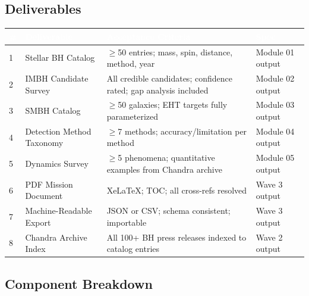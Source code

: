 \documentclass[11pt,letterpaper]{article}
\newcommand{\tableheader}[1]{\textbf{\sffamily\textcolor{white}{#1}}}
\begin{document}
\subsection{Deliverables}

\begin{center}
\begin{tabularx}{\textwidth}{C{0.5cm}L{3.5cm}L{4cm}X}
\toprule
{}
\tableheader{\#} & \tableheader{Deliverable} & \tableheader{Acceptance Criteria} & \tableheader{Spec} \\
 & Stellar BH Catalog & $\geq$50 entries; mass, spin, distance, method, year & Module 01 output \\
2 & IMBH Candidate Survey & All credible candidates; confidence rated; gap analysis included & Module 02 output \\
3 & SMBH Catalog & $\geq$50 galaxies; EHT targets fully parameterized & Module 03 output \\
4 & Detection Method Taxonomy & $\geq$7 methods; accuracy/limitation per method & Module 04 output \\
5 & Dynamics Survey & $\geq$5 phenomena; quantitative examples from Chandra archive & Module 05 output \\
6 & PDF Mission Document & XeLaTeX; TOC; all cross-refs resolved & Wave 3 output \\
7 & Machine-Readable Export & JSON or CSV; schema consistent; importable & Wave 3 output \\
8 & Chandra Archive Index & All 100+ BH press releases indexed to catalog entries & Wave 2 output \\
\bottomrule
\end{tabularx}
\end{center}

\subsection{Component Breakdown}
\end{document}
